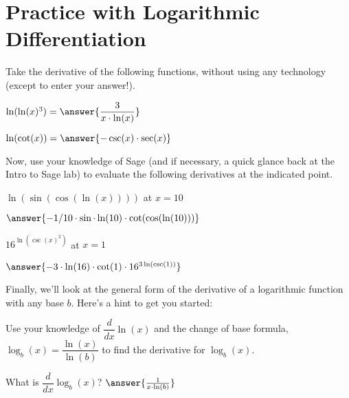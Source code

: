 \documentclass{ximera}
\begin{document}
\section{Practice with Logarithmic Differentiation}
Take the derivative of the following functions, without using any technology (except to enter your answer!).
\begin{problem}
$\ln(\ln(x)^3)=\answer{\dfrac{3}{x\cdot \ln(x)}}$
\end{problem}

\begin{problem}
$\ln(\cot(x))=\answer{-\csc(x)\cdot\sec(x)}$
\end{problem}

Now, use your knowledge of Sage (and if necessary, a quick glance back at the Intro to Sage lab) to evaluate the following derivatives at the indicated point.

\begin{onlineOnly}
\begin{sageCell}

\end{sageCell}
\end{onlineOnly}

\begin{problem}
$\ln(\sin(\cos(\ln(x))))$ at $x=10$

$\answer{-1/10\cdot \sin\cdot\ln(10)\cdot\cot(\cos(\ln(10)))}$
\end{problem}

\begin{problem}
$16^{\ln(\csc(x)^2)}$ at $x = 1$

$\answer{-3\cdot\ln(16)\cdot\cot(1)\cdot 16^{3\ln(\csc(1))}}$
\end{problem}

Finally, we'll look at the general form of the derivative of a logarithmic function with any base $b$. Here's a hint to get you started:

Use your knowledge of $\dfrac{d}{dx} \ln(x)$ and the change of base formula, $\log_b(x) = \dfrac{\ln(x)}{\ln(b)}$ to find the derivative for $\log_b(x)$.
\begin{problem}
What is $\dfrac{d}{dx}\log_b(x)$?
$\answer{\frac{1}{x\cdot\ln(b)}}$
\end{problem}
\end{document}
